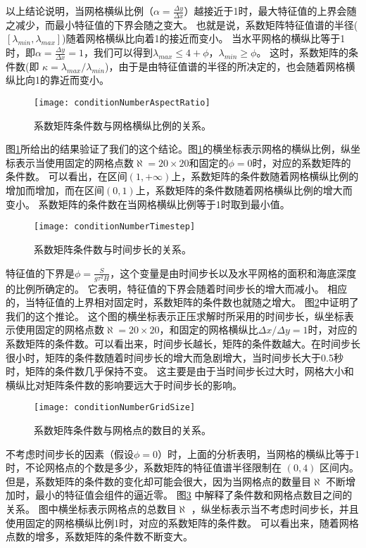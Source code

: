 以上结论说明，当网格横纵比例（$\alpha  = \frac{ \Delta y}{ \Delta x }$）越接近于1时，最大特征值的上界会随之减少，而最小特征值的下界会随之变大。
也就是说，系数矩阵特征值谱的半径($[\lambda_{min}, \lambda_{max}]$)随着网格横纵比向着1的接近而变小。 
当水平网格的横纵比等于1时，即$ \alpha = \frac{ \Delta y}{ \Delta x} = 1$，我们可以得到$\lambda_{max} \le  4 +\phi$，$\lambda_{min} \ge   \phi$。
这时，系数矩阵的条件数(即 $\kappa=  \lambda_{max}/\lambda_{min}$)，由于是由特征值谱的半径的所决定的，也会随着网格横纵比向1的靠近而变小。 

\begin{figure}[ht]
\centering
\texttt{[image: conditionNumberAspectRatio]}
\caption[] {系数矩阵条件数与网格横纵比例的关系。 \label{fig:conditionNumberRatio}}
\end{figure}
图\ref{fig:conditionNumberRatio}所给出的结果验证了我们的这个结论。图\ref{fig:conditionNumberRatio}的横坐标表示网格的横纵比例，纵坐标表示当使用固定的网格点数$\aleph = 20\times 20$和固定的$\phi = 0$时，对应的系数矩阵的条件数。 
可以看出，在区间$(1, +\infty)$上，系数矩阵的条件数随着网格横纵比例的增加而增加，而在区间$(0,1)$上，系数矩阵的条件数随着网格横纵比例的增大而变小。
系数矩阵的条件数在当网格横纵比例等于1时取到最小值。
 
\begin{figure}[ht]
\centering
\texttt{[image: conditionNumberTimestep]}
\caption[] {系数矩阵条件数与时间步长的关系。 \label{fig:conditionNumberDt}}
\end{figure}
特征值的下界是$\phi=\frac{S }{g \tau^2 H}$，这个变量是由时间步长以及水平网格的面积和海底深度的比例所确定的。
它表明，特征值的下界会随着时间步长的增大而减小。 
相应的，当特征值的上界相对固定时，系数矩阵的条件数也就随之增大。
图\ref{fig:conditionNumberDt}中证明了我们的这个推论。
这个图的横坐标表示正压求解时所采用的时间步长，纵坐标表示使用固定的网格点数$\aleph= 20\times 20$，和固定的网格横纵比$\Delta x /{\Delta y} = 1$时，对应的系数矩阵的条件数。可以看出来，时间步长越长，矩阵的条件数越大。在时间步长很小时，矩阵的条件数随着时间步长的增大而急剧增大，当时间步长大于0.5秒时，矩阵的条件数几乎保持不变。
这主要是由于当时间步长过大时，网格大小和横纵比对矩阵条件数的影响要远大于时间步长的影响。

\begin{figure}[ht]
\centering
\texttt{[image: conditionNumberGridSize]}
\caption[] {系数矩阵条件数与网格点的数目的关系。 \label{fig:conditionNumbGrid}}
\end{figure}
 
不考虑时间步长的因素（假设$\phi=0$）时，上面的分析表明，当网格的横纵比等于1时，不论网格点的个数是多少，系数矩阵的特征值谱半径限制在 $(0,4)$ 区间内。
但是，系数矩阵的条件数的变化却可能会很大，因为当网格点的数量目$\aleph$ 不断增加时，最小的特征值会组件的逼近零。 
图\ref{fig:conditionNumbGrid} 中解释了条件数和网格点数目之间的关系。 
图中横坐标表示网格点的总数目$\aleph$ ，纵坐标表示当不考虑时间步长，并且使用固定的网格横纵比例1时，对应的系数矩阵的条件数。
可以看出来，随着网格点数的增多，系数矩阵的条件数不断变大。



